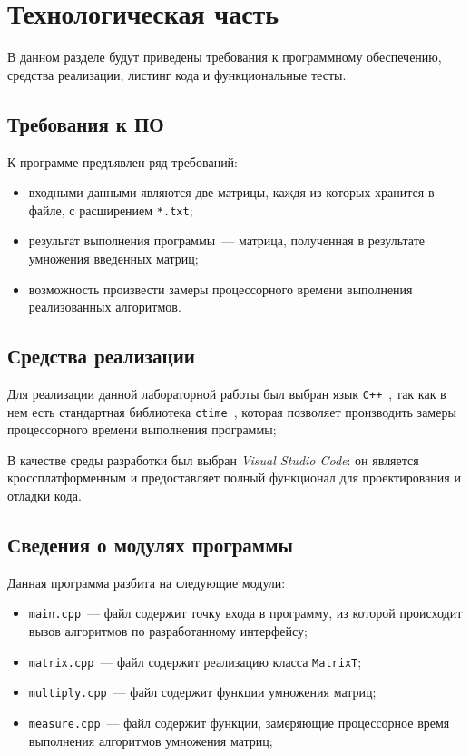 \chapter{Технологическая часть}
В данном разделе будут приведены требования к программному обеспечению, средства реализации, листинг кода и функциональные тесты.

\section{Требования к ПО}
К программе предъявлен ряд требований:
\begin{itemize}
    \item входными данными являются две матрицы, каждя из которых хранится в файле, с расширением \texttt{*.txt};
    \item результат выполнения программы~--- матрица, полученная в результате умножения введенных матриц;
    \item возможность произвести замеры процессорного времени выполнения реализованных алгоритмов.
\end{itemize}

\section{Средства реализации}
Для реализации данной лабораторной работы был выбран язык \texttt{C++}~\cite{cpp-lang}, так как в нем есть стандартная библиотека \texttt{ctime}~\cite{cpp-lang}, которая позволяет производить замеры процессорного времени выполнения программы;

В качестве среды разработки был выбран \textit{Visual Studio Code}: он является кроссплатформенным и предоставляет полный функционал для проектирования и отладки кода.
 
\section{Сведения о модулях программы}
Данная программа разбита на следующие модули:

\begin{itemize}
	\item \texttt{main.cpp}~--- файл содержит точку входа в программу, из которой происходит вызов алгоритмов по разработанному интерфейсу;
	\item \texttt{matrix.cpp}~--- файл содержит реализацию класса \texttt{MatrixT};
	\item \texttt{multiply.cpp}~--- файл содержит функции умножения матриц;
	\item \texttt{measure.cpp}~--- файл содержит функции, замеряющие процессорное время выполнения алгоритмов умножения матриц;
\end{itemize}

